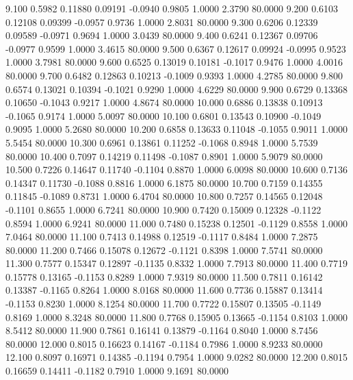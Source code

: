   9.100   0.5982   0.11880   0.09191  -0.0940   0.9805   1.0000   2.3790  80.0000
   9.200   0.6103   0.12108   0.09399  -0.0957   0.9736   1.0000   2.8031  80.0000
   9.300   0.6206   0.12339   0.09589  -0.0971   0.9694   1.0000   3.0439  80.0000
   9.400   0.6241   0.12367   0.09706  -0.0977   0.9599   1.0000   3.4615  80.0000
   9.500   0.6367   0.12617   0.09924  -0.0995   0.9523   1.0000   3.7981  80.0000
   9.600   0.6525   0.13019   0.10181  -0.1017   0.9476   1.0000   4.0016  80.0000
   9.700   0.6482   0.12863   0.10213  -0.1009   0.9393   1.0000   4.2785  80.0000
   9.800   0.6574   0.13021   0.10394  -0.1021   0.9290   1.0000   4.6229  80.0000
   9.900   0.6729   0.13368   0.10650  -0.1043   0.9217   1.0000   4.8674  80.0000
  10.000   0.6886   0.13838   0.10913  -0.1065   0.9174   1.0000   5.0097  80.0000
  10.100   0.6801   0.13543   0.10900  -0.1049   0.9095   1.0000   5.2680  80.0000
  10.200   0.6858   0.13633   0.11048  -0.1055   0.9011   1.0000   5.5454  80.0000
  10.300   0.6961   0.13861   0.11252  -0.1068   0.8948   1.0000   5.7539  80.0000
  10.400   0.7097   0.14219   0.11498  -0.1087   0.8901   1.0000   5.9079  80.0000
  10.500   0.7226   0.14647   0.11740  -0.1104   0.8870   1.0000   6.0098  80.0000
  10.600   0.7136   0.14347   0.11730  -0.1088   0.8816   1.0000   6.1875  80.0000
  10.700   0.7159   0.14355   0.11845  -0.1089   0.8731   1.0000   6.4704  80.0000
  10.800   0.7257   0.14565   0.12048  -0.1101   0.8655   1.0000   6.7241  80.0000
  10.900   0.7420   0.15009   0.12328  -0.1122   0.8594   1.0000   6.9241  80.0000
  11.000   0.7480   0.15238   0.12501  -0.1129   0.8558   1.0000   7.0464  80.0000
  11.100   0.7413   0.14988   0.12519  -0.1117   0.8484   1.0000   7.2875  80.0000
  11.200   0.7466   0.15078   0.12672  -0.1121   0.8398   1.0000   7.5741  80.0000
  11.300   0.7577   0.15347   0.12897  -0.1135   0.8332   1.0000   7.7913  80.0000
  11.400   0.7719   0.15778   0.13165  -0.1153   0.8289   1.0000   7.9319  80.0000
  11.500   0.7811   0.16142   0.13387  -0.1165   0.8264   1.0000   8.0168  80.0000
  11.600   0.7736   0.15887   0.13414  -0.1153   0.8230   1.0000   8.1254  80.0000
  11.700   0.7722   0.15807   0.13505  -0.1149   0.8169   1.0000   8.3248  80.0000
  11.800   0.7768   0.15905   0.13665  -0.1154   0.8103   1.0000   8.5412  80.0000
  11.900   0.7861   0.16141   0.13879  -0.1164   0.8040   1.0000   8.7456  80.0000
  12.000   0.8015   0.16623   0.14167  -0.1184   0.7986   1.0000   8.9233  80.0000
  12.100   0.8097   0.16971   0.14385  -0.1194   0.7954   1.0000   9.0282  80.0000
  12.200   0.8015   0.16659   0.14411  -0.1182   0.7910   1.0000   9.1691  80.0000

